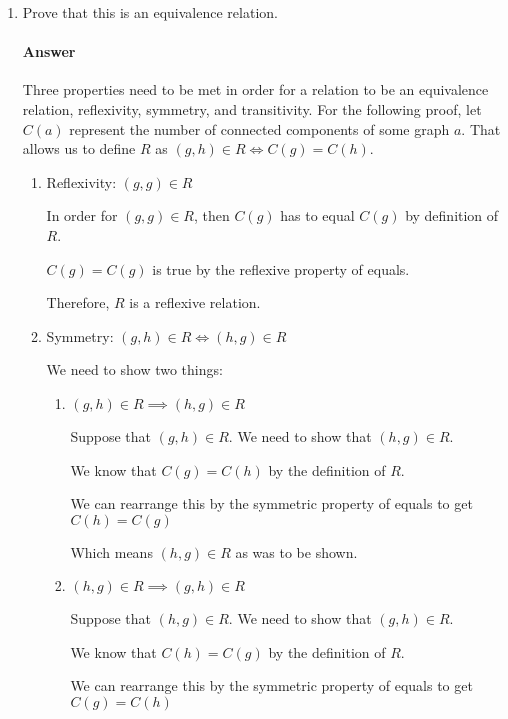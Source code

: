 \documentclass{article}
\begin{document}
\begin{enumerate}

    \item Prove that this is an equivalence relation.

        \paragraph{Answer}

        Three properties need to be met in order for a relation to be an equivalence relation, reflexivity, symmetry, and transitivity.
        For the following proof, let $C(a)$ represent the number of connected components of some graph $a$. That allows us to define $R$ as $(g, h) \in R \iff C(g) = C(h)$.
        
        \begin{enumerate}
        \item Reflexivity: $(g, g) \in R$
        
        In order for $(g, g) \in R$, then $C(g)$ has to equal $C(g)$ by definition of $R$.
         
        $C(g) = C(g)$ is true by the reflexive property of equals.
        
        Therefore, $R$ is a reflexive relation.
        
        \item Symmetry: $(g, h) \in R \iff (h, g) \in R$
        
        We need to show two things:
        \begin{enumerate}
        \item $(g, h) \in R \implies (h, g) \in R$
        
        Suppose that $(g, h) \in R$. We need to show that $(h, g) \in R$.
        
        We know that $C(g) = C(h)$ by the definition of $R$.
        
        We can rearrange this by the symmetric property of equals to get $C(h) = C(g)$
       
       Which means $(h, g) \in R$ as was to be shown.
       
       \item $(h, g) \in R \implies (g, h) \in R$
       
       Suppose that $(h, g) \in R$. We need to show that $(g, h) \in R$.
        
        We know that $C(h) = C(g)$ by the definition of $R$.
        
        We can rearrange this by the symmetric property of equals to get $C(g) = C(h)$
       

\end{enumerate}
\end{enumerate}
\end{enumerate}
\end{document}
